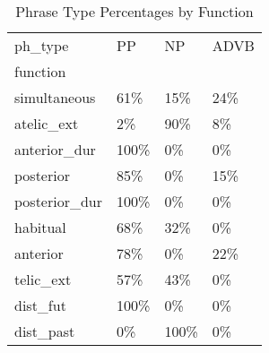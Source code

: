 \begin{table}[htbp!]
\centering
\caption{Phrase Type Percentages by Function}
\label{table:funcpt_pr}
\begin{tabular}{llll}
\toprule
ph\_type &    PP &    NP & ADVB \\
function      &       &       &      \\
\midrule
simultaneous  &   61\% &   15\% &  24\% \\
atelic\_ext    &    2\% &   90\% &   8\% \\
anterior\_dur  &  100\% &    0\% &   0\% \\
posterior     &   85\% &    0\% &  15\% \\
posterior\_dur &  100\% &    0\% &   0\% \\
habitual      &   68\% &   32\% &   0\% \\
anterior      &   78\% &    0\% &  22\% \\
telic\_ext     &   57\% &   43\% &   0\% \\
dist\_fut      &  100\% &    0\% &   0\% \\
dist\_past     &    0\% &  100\% &   0\% \\
\bottomrule
\end{tabular}
\end{table}
